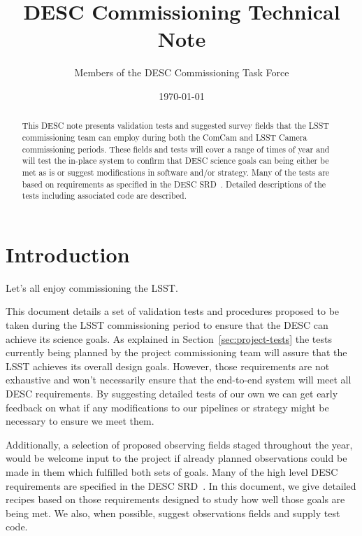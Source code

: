 \documentclass[modern]{desc-tex/styles/lsstdescnote}
\begin{document}
\title{DESC Commissioning Technical Note}
\author{Members of the DESC Commissioning Task Force}
\date{\today}

\begin{abstract}

  This DESC note presents validation tests and suggested survey fields that the LSST commissioning team can employ during both the ComCam and LSST Camera commissioning periods. These fields and tests will cover a range of times of year and will test the in-place system to confirm that DESC science goals can being either be met as is or suggest modifications in software and/or strategy.  Many of the tests are based on requirements as specified in the DESC SRD~\cite{DESC-SRD}.  Detailed descriptions of the tests including associated code are described.  \end{abstract}

\maketitle

\noindent
\begin{center}
  \fboxsep=5pt  
 \end{center} 
\vspace{0.1in}

\section{Introduction}

Let's all enjoy commissioning the LSST.

This document details a set of validation tests and procedures proposed to be taken during the LSST commissioning period to ensure that the DESC can achieve its science goals.  As explained in Section~\ref{sec:project-tests} the tests currently being planned by the project commissioning team will assure that the LSST achieves its overall design goals. However, those requirements are not exhaustive and won't necessarily ensure that the end-to-end system will meet all DESC requirements.  By suggesting detailed tests of our own we can get early feedback on what if any modifications to our pipelines or strategy might be necessary to ensure we meet them.

Additionally, a selection of proposed observing fields staged throughout the year, would be welcome input to the project if already planned observations could be made in them which fulfilled both sets of goals.  Many of the high level DESC requirements are specified in the DESC SRD~\cite{DESC-SRD}.  In this document, we  give detailed recipes based on those requirements designed to study how well those goals are being met. We also, when possible, suggest observations fields and supply test code.
\end{document}
